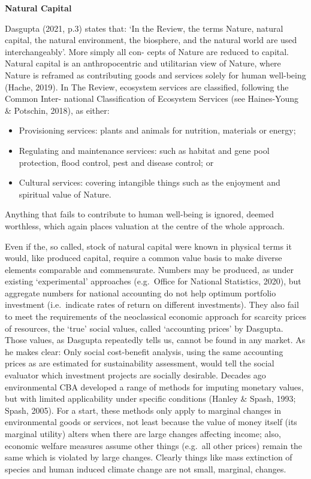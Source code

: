 \documentclass[
]{book}
\providecommand{\tightlist}{%
  \setlength{\itemsep}{0pt}\setlength{\parskip}{0pt}}
\begin{document}
\textbf{Natural Capital}

Dasgupta (2021, p.3) states that: `In the Review, the terms Nature, natural capital, the natural
environment, the biosphere, and the natural world are used interchangeably'. More simply all con-
cepts of Nature are reduced to capital. Natural capital is an anthropocentric and utilitarian view of
Nature, where Nature is reframed as contributing goods and services solely for human well-being
(Hache, 2019). In The Review, ecosystem services are classified, following the Common Inter-
national Classification of Ecosystem Services (see Haines-Young \& Potschin, 2018), as either:

\begin{itemize}
\tightlist
\item
  Provisioning services: plants and animals for nutrition, materials or energy;
\item
  Regulating and maintenance services: such as habitat and gene pool protection, flood control,
  pest and disease control; or
\item
  Cultural services: covering intangible things such as the enjoyment and spiritual value of Nature.
\end{itemize}

Anything that fails to contribute to human well-being is ignored, deemed worthless, which again
places valuation at the centre of the whole approach.

Even if the, so called, stock of natural capital were known in physical terms it would, like produced
capital, require a common value basis to make diverse elements comparable and commensurate.
Numbers may be produced, as under existing `experimental' approaches (e.g.~Office for National
Statistics, 2020), but aggregate numbers for national accounting do not help optimum portfolio
investment (i.e.~indicate rates of return on different investments). They also fail to meet the requirements of the neoclassical economic approach for scarcity prices of resources, the `true' social values,
called `accounting prices' by Dasgupta. Those values, as Dasgupta repeatedly tells us, cannot be
found in any market. As he makes clear:
Only social cost-benefit analysis, using the same accounting prices as are estimated for sustainability
assessment, would tell the social evaluator which investment projects are socially desirable.
Decades ago environmental CBA developed a range of methods for imputing monetary values, but
with limited applicability under specific conditions (Hanley \& Spash, 1993; Spash, 2005). For a
start, these methods only apply to marginal changes in environmental goods or services, not
least because the value of money itself (its marginal utility) alters when there are large changes
affecting income; also, economic welfare measures assume other things (e.g.~all other prices) remain
the same which is violated by large changes. Clearly things like mass extinction of species and
human induced climate change are not small, marginal, changes.
\end{document}
